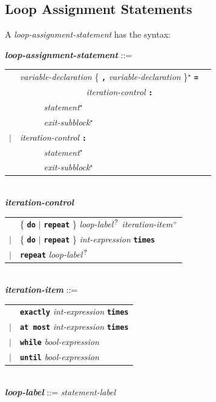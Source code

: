 \documentclass[12pt]{article}
\newcommand{\TT}[1]{{\tt \bfseries #1}}
\newcommand{\STAR}{{\Large $^\star$}}
\newcommand{\PLUS}[1][]{{$^{+#1}$}}
\newcommand{\QMARK}{{$^{\,\mbox{\footnotesize ?}}$}}
\newcommand{\ttkey}[1]{{\tt \bfseries #1}}
\newcommand{\emkey}[1]{{\em \bfseries #1}}
\newenvironment{indpar}[1][0.3in]%
	{\begin{list}{}%
		     {\setlength{\itemsep}{0in}%
		      \setlength{\topsep}{0in}%
		      \setlength{\parsep}{1ex}%
		      \setlength{\labelwidth}{#1}%
		      \setlength{\leftmargin}{#1}%
		      \addtolength{\leftmargin}{\labelsep}}%
	 \item}%
	{\end{list}}
\begin{document}
\subsection{Loop Assignment Statements}
\label{LOOP-ASSIGNMENT-STATEMENTS}

A {\em loop-assignment-statement} has the syntax:

\begin{indpar}
\emkey{loop-assignment-statement} ::= \\
\hspace*{0.5in}
    \begin{tabular}[t]{@{}rll}
        & {\em variable-declaration}
                \{ \TT{,} {\em variable-declaration} \}\STAR{}
		\TT{=} \\
	& ~~~~~~~~~~~~~~~ {\em iteration-control} \TT{:} \\
        & ~~~~~ {\em statement}\STAR{} \\
        & ~~~~~ {\em exit-subblock}\STAR{} \\
    $|$ & {\em iteration-control} \TT{:} \\
        & ~~~~~ {\em statement}\STAR{} \\
        & ~~~~~ {\em exit-subblock}\STAR{} \\
    \end{tabular}
\\[0.5ex]
\emkey{iteration-control}\label{ITERATION-CONTROL}
    \begin{tabular}[t]{rl}
         & \{ \ttkey{do} $|$ \ttkey{repeat} \} {\em loop-label}\QMARK{}
           {\em iteration-item}\PLUS{} \\
     $|$ & \{ \ttkey{do} $|$ \ttkey{repeat} \}
           {\em int-expression} \ttkey{times } \\
     $|$ & \ttkey{repeat} {\em loop-label}\QMARK{}
     \end{tabular}
\\[0.5ex]
\emkey{iteration-item}\label{ITERATION-ITEM} ::=
    \begin{tabular}[t]{rl}
         & \ttkey{exactly} {\em int-expression} \ttkey{times} \\
     $|$ & \ttkey{at most} {\em int-expression} \ttkey{times} \\
     $|$ & \ttkey{while} {\em bool-expression} \\
     $|$ & \ttkey{until} {\em bool-expression} \\
     \end{tabular}
\\[0.5ex]
\emkey{loop-label} ::= {\em statement-label}

\end{indpar}
\end{document}
